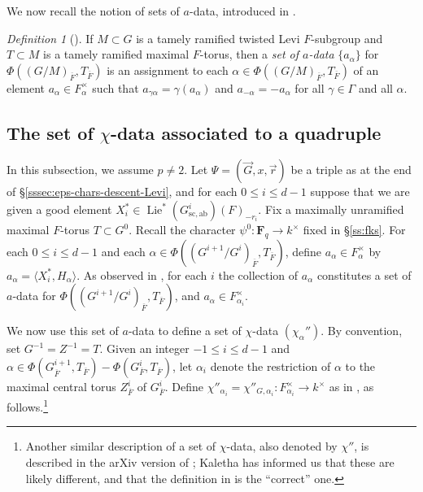 \documentclass[reqno]{amsart}
\numberwithin{equation}{subsection}
\newcommand{\F}{\mathbf{F}}
\newcommand{\ol}[1]{\overline{#1}}
\newcommand{\co}{\colon}
\DeclareMathOperator{\Lie}{Lie}
\theoremstyle{remark}
\newtheorem{defn}[thm]{Definition}
\numberwithin{equation}{subsection}
\numberwithin{figure}{subsection}
\begin{document}
We now recall the notion of sets of $a$-data, introduced in \cite{LS87}.

\begin{defn}[{\cite[\S 4.6]{Kal19}}]\label{defn:a-data}
If $M \subset G$ is a tamely ramified twisted Levi $F$-subgroup and $T \subset M$ is a tamely ramified maximal $F$-torus, then a \textit{set of $a$-data} $\{a_\alpha\}$ for $\Phi((G/M)_{\ol F}, T_{\ol F})$ is an assignment to each $\alpha \in \Phi((G/M)_{\ol F}, T_{\ol F})$ of an element $a_\alpha \in F_\alpha^\times$ such that $a_{\gamma\alpha} = \gamma(a_\alpha)$ and $a_{-\alpha} = -a_\alpha$ for all $\gamma \in \Gamma$ and all $\alpha$.
\end{defn}


\subsection{The set of $\chi$-data associated to a quadruple}\label{sss:canonical-chi-data}

In this subsection, we assume $p \neq 2$.
Let $\Psi = (\vec{G}, x, \vec{r})$ be a triple as at the end of \S\ref{sssec:eps-chars-descent-Levi}, and for each $0 \leq i \leq d-1$ suppose that we are given a good element $X_i^* \in \Lie^*(G^i_{\mathrm{sc,ab}})(F)_{-r_i}$. Fix a maximally unramified maximal $F$-torus $T \subset G^0$. Recall the character $\psi^0\co \F_q \to k^\times$ fixed in \S\ref{ss:fks}. For each $0 \leq i \leq d-1$ and each $\alpha \in \Phi((G^{i+1}/G^i)_{\ol F}, T_{\ol F})$, define $a_\alpha \in F_\alpha^\times$ by $a_\alpha = \langle X_i^*, H_\alpha\rangle$. As observed in \cite[Notation 4.2.2]{FKS23}, for each $i$ the collection of $a_\alpha$ constitutes a set of $a$-data for $\Phi((G^{i+1}/G^i)_{\ol F}, T_{\ol F})$, and $a_\alpha \in F_{\alpha_i}^\times$.

We now use this set of $a$-data to define a set of $\chi$-data $(\chi_\alpha'')$. By convention, set $G^{-1}=Z^{-1}=T$. Given an integer $-1\leq i\leq d-1$ and $\alpha \in \Phi(G^{i+1}_{\ol F}, T_{\ol F}) - \Phi(G^i_{\ol F}, T_{\ol F})$, let $\alpha_i$ denote the restriction of $\alpha$ to the maximal central torus $Z^i_{\ol F}$ of $G^i_{\ol F}$. Define $\chi''_{\alpha_i} = \chi''_{G,\alpha_i} \co F_{\alpha_i}^\times \to k^\times$ as in \cite[Notation 4.2.2]{FKS23}, as follows.\footnote{Another similar description of a set of $\chi$-data, also denoted by $\chi''$, is described in the arXiv version of \cite[\S 3.5]{Kal21b}; Kaletha has informed us that these are likely different, and that the definition in \cite{FKS23} is the ``correct'' one.}
\end{document}
